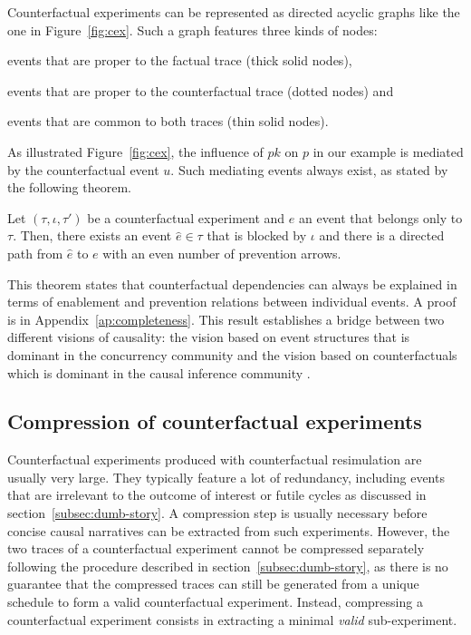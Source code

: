 Counterfactual experiments can be represented as directed acyclic
graphs like the one in Figure~\ref{fig:cex}. Such a graph features
three kinds of nodes:
\begin{inparaenum}[]
\item events that are proper to the factual trace (thick solid nodes),
\item events that are proper to the counterfactual trace (dotted
  nodes) and
\item events that are common to both traces (thin solid nodes).
\end{inparaenum}

As illustrated Figure~\ref{fig:cex}, the influence of $pk$ on $p$ in
our example is mediated by the counterfactual event $u$. Such
mediating events always exist, as stated by the following theorem.

\begin{theorem}
  \label{thm:completeness}
  Let $(\tau, \iota, \tau')$ be a counterfactual experiment and $e$ an
  event that belongs only to $\tau$. Then, there exists an event
  $\hat e \in \tau$ that is blocked by $\iota$ and there is a directed
  path from $\hat e$ to $e$ with an even number of prevention arrows.
\end{theorem}
\noindent This theorem states that counterfactual dependencies can
always be explained in terms of enablement and prevention relations
between individual events. A proof is in
Appendix~\ref{ap:completeness}. This result establishes a bridge
between two different visions of causality: the vision based on event
structures \cite{winskel1986event} that is dominant in the concurrency
community and the vision based on counterfactuals which is dominant in
the causal inference community \cite{pearl2009causality}.

\subsection{Compression of counterfactual experiments}

Counterfactual experiments produced with counterfactual resimulation
are usually very large. They typically feature a lot of redundancy,
including events that are irrelevant to the outcome of interest or
futile cycles as discussed in section~\ref{subsec:dumb-story}. A
compression step is usually necessary before concise causal narratives
can be extracted from such experiments. However, the two traces of a
counterfactual experiment cannot be compressed separately following
the procedure described in section~\ref{subsec:dumb-story}, as there
is no guarantee that the compressed traces can still be generated from
a unique schedule to form a valid counterfactual experiment. Instead,
compressing a counterfactual experiment consists in extracting a
minimal \emph{valid} sub-experiment.

